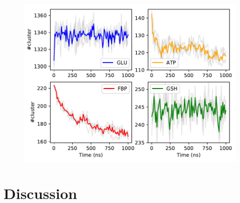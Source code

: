 \documentclass[journal=jacsat,manuscript=article]{achemso}
\begin{document}
\begin{figure}
\includegraphics[scale=0.6]{nclust.pdf}
\end{figure}









 
\section*{Discussion}\label{sec:dissc}
 




 

 
\end{document}
